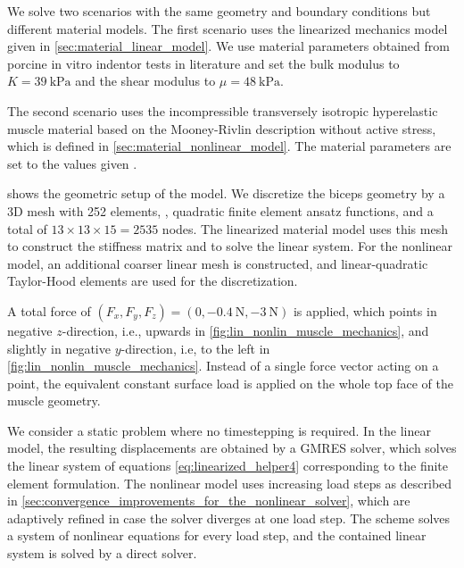 We solve two scenarios with the same geometry and boundary conditions but different material models. The first scenario uses the linearized mechanics model given in \cref{sec:material_linear_model}. We use material parameters obtained from porcine in vitro indentor tests in literature \cite{schock1982vivo} and set the bulk modulus to $K=\SI{39}{\kilo\pascal}$ and the shear modulus to $\mu=\SI{48}{\kilo\pascal}$.

The second scenario uses the incompressible transversely isotropic hyperelastic muscle material based on the Mooney-Rivlin description without active stress, which is defined in \cref{sec:material_nonlinear_model}. The material parameters are set to the values given \cite{Heidlauf2016}.

 shows the geometric setup of the model. We discretize the biceps geometry by a 3D mesh with 252  elements, , quadratic finite element ansatz functions,  and a total of $13 \times 13 \times 15 = 2535$ nodes.
The linearized material model uses this mesh to construct the stiffness matrix and to solve the linear system.
For the nonlinear model, an additional coarser linear mesh is constructed, and linear-quadratic Taylor-Hood elements are used for the discretization. 

A total force of $(F_x,F_y,F_z) = (0,\SI{-0.4}{\newton},\SI{-3}{\newton})$ is applied, which points in negative $z$-direction, i.e., upwards in \cref{fig:lin_nonlin_muscle_mechanics}, and slightly in negative $y$-direction, i.e, to the left in \cref{fig:lin_nonlin_muscle_mechanics}.
Instead of a single force vector acting on a point, the equivalent constant surface load is applied on the whole top face of the muscle geometry.

We consider a static problem where no timestepping is required. In the linear model, the resulting displacements are obtained by a GMRES solver, which solves the linear system of equations \cref{eq:linearized_helper4} corresponding  to the finite element formulation.
The nonlinear model uses increasing load steps as described in \cref{sec:convergence_improvements_for_the_nonlinear_solver}, which are adaptively refined in case the solver diverges at one load step. The scheme solves a system of nonlinear equations for every load step, and the contained linear system is solved by a direct solver.

